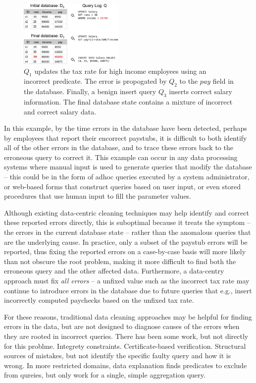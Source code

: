 \begin{figure}[t]
    \centering
        \includegraphics[width=0.45\textwidth]{figures/example}
    \caption{$Q_1$ updates the tax rate for high income employees using an incorrect predicate.  
      The error is propogated by $Q_2$ to the $pay$ field in the database.
      Finally, a benign insert query $Q_3$ inserts correct salary information. 
      The final database state contains a mixture of incorrect and correct salary data.
    }
    \label{fig:example}
\end{figure}


In this example, by the time errors in the database have been detected, 
perhaps by employees that report their encorrect paystubs, it is difficult 
to both identify all of the other errors in the database, and to trace these errors back to the erroneous query to correct it.
This example can occur in any data processing systems where manual input is used to generate queries that modify the database --
this could be in the form of adhoc queries executed by a system administrator, or web-based forms that construct queries based
on user input, or even stored procedures that use human input to fill the parameter values.

Although existing data-centric cleaning techniques may help identify and correct these reported errors directly, 
this is suboptimal because it treats the symptom -- the errors in the current database state -- rather than the anomalous
queries that are the underlying cause.  In practice, only a subset of the paystub errors will be reported, thus fixing
the reported errors on a case-by-case basis will more likely than not obscure the root problem, making it more difficult to
find both the erroneous query and the other affected data.  
Furthermore, a data-centry approach must fix {\it all errors} -- a unfixed value such as the incorrect tax rate
may continue to introduce errors in the database due to future queries that 
e.g., insert incorrectly computed paychecks based on the unfixed tax rate.

For these reasons, traditional data cleaning approaches may be helpful for finding errors in the data, but are
not designed to diagnose causes of the errors when they are rooted in incorrect queries.
There has been some work, but not directly for this problme.  
Integrety constraints.
Certificate-based verification.
Structural sources of mistakes, but not identify the specific faulty query and how it is wrong.
In more restricted domains, data explanation finds predicates to exclude from qureies, but only work for a single, simple  aggregation query.

